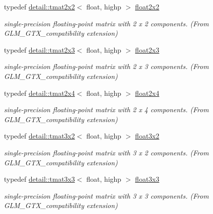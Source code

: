 \begin{DoxyCompactItemize}
typedef \hyperlink{structglm_1_1detail_1_1tmat2x2}{detail\+::tmat2x2}$<$ float, highp $>$ \hyperlink{group__gtx__compatibility_gaa4a1e4449913b2437f12434ed713dd73}{float2x2}
\begin{DoxyCompactList}\small\item\em single-\/precision floating-\/point matrix with 2 x 2 components. (From G\+L\+M\+\_\+\+G\+T\+X\+\_\+compatibility extension) \end{DoxyCompactList}\item 
typedef \hyperlink{structglm_1_1detail_1_1tmat2x3}{detail\+::tmat2x3}$<$ float, highp $>$ \hyperlink{group__gtx__compatibility_gaf6c91675c075853da392b1d2dfc45f65}{float2x3}
\begin{DoxyCompactList}\small\item\em single-\/precision floating-\/point matrix with 2 x 3 components. (From G\+L\+M\+\_\+\+G\+T\+X\+\_\+compatibility extension) \end{DoxyCompactList}\item 
typedef \hyperlink{structglm_1_1detail_1_1tmat2x4}{detail\+::tmat2x4}$<$ float, highp $>$ \hyperlink{group__gtx__compatibility_gaaff795523eb814705d3f1cc7fd3421f2}{float2x4}
\begin{DoxyCompactList}\small\item\em single-\/precision floating-\/point matrix with 2 x 4 components. (From G\+L\+M\+\_\+\+G\+T\+X\+\_\+compatibility extension) \end{DoxyCompactList}\item 
typedef \hyperlink{structglm_1_1detail_1_1tmat3x2}{detail\+::tmat3x2}$<$ float, highp $>$ \hyperlink{group__gtx__compatibility_ga19bcbd4d65c70cd07907b2d688bc84ed}{float3x2}
\begin{DoxyCompactList}\small\item\em single-\/precision floating-\/point matrix with 3 x 2 components. (From G\+L\+M\+\_\+\+G\+T\+X\+\_\+compatibility extension) \end{DoxyCompactList}\item 
typedef \hyperlink{structglm_1_1detail_1_1tmat3x3}{detail\+::tmat3x3}$<$ float, highp $>$ \hyperlink{group__gtx__compatibility_ga11458ecd63c32b7e502d90091a6d0a6c}{float3x3}
\begin{DoxyCompactList}\small\item\em single-\/precision floating-\/point matrix with 3 x 3 components. (From G\+L\+M\+\_\+\+G\+T\+X\+\_\+compatibility extension) \end{DoxyCompactList}\item 

\end{DoxyCompactItemize}
